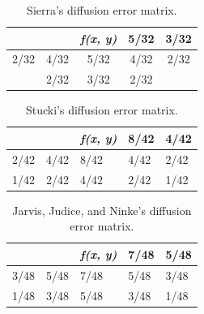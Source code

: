 \documentclass[conference]{IEEEtran}
\begin{document}
\begin{table}[!h]
\centering
\renewcommand{\arraystretch}{1.5}
\begin{tabular}{c|c|c|c|c}
 &  & \textit{f(x, y)} & 5/32 & 3/32 \\ \hline
2/32 & 4/32 & 5/32 & 4/32 & 2/32 \\ \hline
 & 2/32 & 3/32 & 2/32 & 
\end{tabular}
\caption{Sierra's diffusion error matrix.}
\label{tab:sie}
\end{table}

\begin{table}[!h]
\centering
\renewcommand{\arraystretch}{1.5}
\begin{tabular}{l|l|l|l|l}
 &  & \textit{f(x, y)} & 8/42 & 4/42 \\ \hline
2/42 & 4/42 & 8/42 & 4/42 & 2/42 \\ \hline
1/42 & 2/42 & 4/42 & 2/42 & 1/42
\end{tabular}
\caption{Stucki's diffusion error matrix.}
\label{tab:stu}
\end{table}

\begin{table}[!h]
\centering
\renewcommand{\arraystretch}{1.5}
\begin{tabular}{l|l|l|l|l}
 &  & \textit{f(x, y)} & 7/48 & 5/48 \\ \hline
3/48 & 5/48 & 7/48 & 5/48 & 3/48 \\ \hline
1/48 & 3/48 & 5/48 & 3/48 & 1/48
\end{tabular}
\caption{Jarvis, Judice, and Ninke's diffusion error matrix.}
\label{tab:jar}
\end{table}
\end{document}

